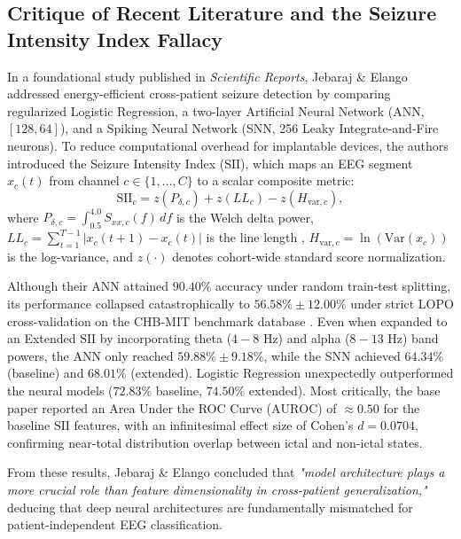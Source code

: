 \documentclass[pdflatex,sn-mathphys-num]{sn-jnl}
\begin{document}
\subsection{Critique of Recent Literature and the Seizure Intensity Index Fallacy}
In a foundational study published in \textit{Scientific Reports}, Jebaraj \& Elango \cite{jebaraj2026} addressed energy-efficient cross-patient seizure detection by comparing regularized Logistic Regression, a two-layer Artificial Neural Network (ANN, $[128, 64]$), and a Spiking Neural Network (SNN, 256 Leaky Integrate-and-Fire neurons). To reduce computational overhead for implantable devices, the authors introduced the Seizure Intensity Index ($\text{SII}$), which maps an EEG segment $x_c(t)$ from channel $c \in \{1, \dots, C\}$ to a scalar composite metric:
\begin{equation}
\text{SII}_c = z(P_{\delta, c}) + z(LL_c) - z(H_{\text{var}, c}),
\label{eq:sii_base}
\end{equation}
where $P_{\delta, c} = \int_{0.5}^{4.0} S_{xx, c}(f)\,df$ is the Welch delta power, $LL_c = \sum_{t=1}^{T-1} |x_c(t+1) - x_c(t)|$ is the line length \cite{esteller2001line}, $H_{\text{var}, c} = \ln(\text{Var}(x_c))$ is the log-variance, and $z(\cdot)$ denotes cohort-wide standard score normalization.

Although their ANN attained $90.40\%$ accuracy under random train-test splitting, its performance collapsed catastrophically to $56.58\% \pm 12.00\%$ under strict LOPO cross-validation on the CHB-MIT benchmark database \cite{guttag2010chb}. Even when expanded to an Extended $\text{SII}$ by incorporating theta ($4 - 8\text{ Hz}$) and alpha ($8 - 13\text{ Hz}$) band powers, the ANN only reached $59.88\% \pm 9.18\%$, while the SNN achieved $64.34\%$ (baseline) and $68.01\%$ (extended). Logistic Regression unexpectedly outperformed the neural models ($72.83\%$ baseline, $74.50\%$ extended). Most critically, the base paper reported an Area Under the ROC Curve ($\text{AUROC}$) of $\approx 0.50$ for the baseline $\text{SII}$ features, with an infinitesimal effect size of Cohen's $d = 0.0704$, confirming near-total distribution overlap between ictal and non-ictal states.

From these results, Jebaraj \& Elango \cite{jebaraj2026} concluded that \textit{"model architecture plays a more crucial role than feature dimensionality in cross-patient generalization,"} deducing that deep neural architectures are fundamentally mismatched for patient-independent EEG classification.
\end{document}
